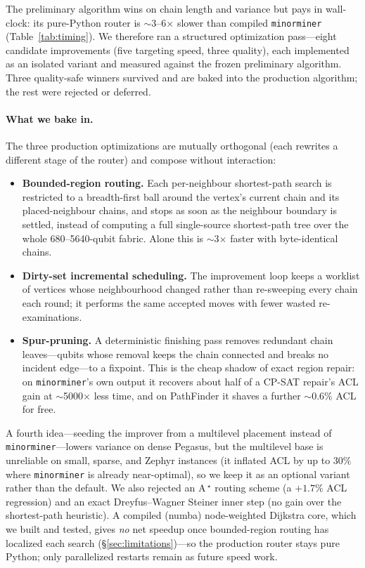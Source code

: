 \documentclass[acmsmall,anonymous,nonacm]{acmart}
\begin{document}
The preliminary algorithm wins on chain length and variance but pays in
wall-clock: its pure-Python router is $\sim$3--6$\times$ slower than compiled
\texttt{minorminer} (Table~\ref{tab:timing}). We therefore ran a structured
optimization pass---eight candidate improvements (five targeting speed, three
quality), each implemented as an isolated variant and measured against the frozen
preliminary algorithm. Three quality-safe winners survived and are baked into the
production algorithm; the rest were rejected or deferred.

\paragraph{What we bake in.} The three production optimizations are mutually
orthogonal (each rewrites a different stage of the router) and compose without
interaction:
\begin{itemize}
  \item \textbf{Bounded-region routing.} Each per-neighbour shortest-path search
    is restricted to a breadth-first ball around the vertex's current chain and
    its placed-neighbour chains, and stops as soon as the neighbour boundary is
    settled, instead of computing a full single-source shortest-path tree over
    the whole 680--5640-qubit fabric. Alone this is $\sim$3$\times$ faster with
    byte-identical chains.
  \item \textbf{Dirty-set incremental scheduling.} The improvement loop keeps a
    worklist of vertices whose neighbourhood changed rather than re-sweeping
    every chain each round; it performs the same accepted moves with fewer
    wasted re-examinations.
  \item \textbf{Spur-pruning.} A deterministic finishing pass removes redundant
    chain leaves---qubits whose removal keeps the chain connected and breaks no
    incident edge---to a fixpoint. This is the cheap shadow of exact region
    repair: on \texttt{minorminer}'s own output it recovers about half of a
    CP-SAT repair's ACL gain at $\sim$5000$\times$ less time, and on PathFinder it
    shaves a further ${\sim}0.6\%$ ACL for free.
\end{itemize}
A fourth idea---seeding the improver from a multilevel placement instead of
\texttt{minorminer}---lowers variance on dense Pegasus, but the multilevel base is
unreliable on small, sparse, and Zephyr instances (it inflated ACL by up to
$30\%$ where \texttt{minorminer} is already near-optimal), so we keep it as an
optional variant rather than the default. We also rejected an A\,$^\star$ routing
scheme (a $+1.7\%$ ACL regression) and an exact Dreyfus--Wagner Steiner inner step
(no gain over the shortest-path heuristic). A compiled (numba) node-weighted
Dijkstra core, which we built and tested, gives \emph{no} net speedup once
bounded-region routing has localized each search
(\S\ref{sec:limitations})---so the production router stays pure Python; only
parallelized restarts remain as future speed work.
\end{document}
